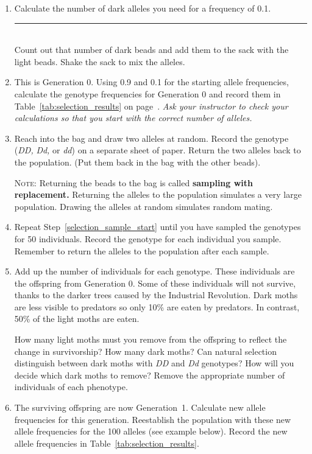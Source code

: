 \documentclass[12pt]{exam}
\newcommand{\allele}[1]{\textit{#1}}
\begin{document}
\begin{questions}
\begin{enumerate}
	\item Calculate the number of dark alleles you need for a frequency of 0.1. \hfill \rule{0.5in}{0.4pt} \\ Count out that number of dark beads and add them to the sack with the light beads. Shake the sack to mix the alleles.
	
	\item This is Generation 0. Using 0.9 and 0.1 for the starting allele frequencies, calculate the genotype frequencies for Generation 0 and record them in Table~\ref{tab:selection_results} on page~\pageref{tab:selection_results}. \emph{Ask your instructor to check your calculations so that you start with the correct number of alleles.}
	
	\item \label{selection_sample_start} Reach into the bag and draw two alleles at random. Record the genotype (\allele{DD,} \allele{Dd,} or \allele{dd}) on a separate sheet of paper. Return the two alleles back to the population. (Put them back in the bag with the other beads).
	
	\textsc{Note:} Returning the beads to the bag is called \textbf{sampling with replacement.} Returning the alleles to the population simulates a very large population. Drawing the alleles at random simulates random mating.
	
	\item Repeat Step~\ref{selection_sample_start} until you have sampled the genotypes for 50 individuals. Record the genotype for each individual you sample. Remember to return the alleles to the population after each sample. 
	
	\item Add up the number of individuals for each genotype. These individuals are the offspring from Generation 0. Some of these individuals will not survive, thanks to the darker trees caused by the Industrial Revolution. Dark moths are less visible to predators so only 10\% are eaten by predators. In contrast, 50\% of the light moths are eaten. 
	
	How many light moths must you remove from the offspring to reflect the change in survivorship? How many dark moths? Can natural selection distinguish between dark moths with \allele{DD} and \allele{Dd} genotypes? How will you decide which dark moths to remove? Remove the appropriate number of individuals of each phenotype.
	
	\item \label{selection_sample_stop} The surviving offspring are now Generation~1. Calculate new allele frequencies for this generation. Reestablish the population with these new allele frequencies for the 100 alleles (see example below). Record the new allele frequencies in Table~\ref{tab:selection_results}.
	

\end{enumerate}
\end{questions}
\end{document}
